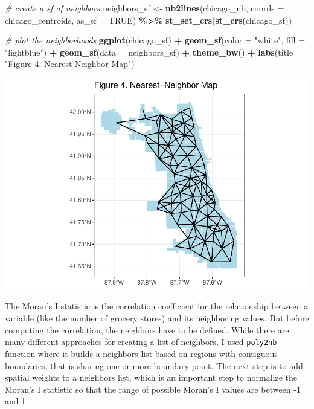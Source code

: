\documentclass[
]{article}
\newenvironment{Shaded}{\begin{snugshade}}{\end{snugshade}}
\newcommand{\AttributeTok}[1]{\textcolor[rgb]{0.13,0.29,0.53}{#1}}
\newcommand{\CommentTok}[1]{\textcolor[rgb]{0.56,0.35,0.01}{\textit{#1}}}
\newcommand{\ConstantTok}[1]{\textcolor[rgb]{0.56,0.35,0.01}{#1}}
\newcommand{\FunctionTok}[1]{\textcolor[rgb]{0.13,0.29,0.53}{\textbf{#1}}}
\newcommand{\NormalTok}[1]{#1}
\newcommand{\OtherTok}[1]{\textcolor[rgb]{0.56,0.35,0.01}{#1}}
\newcommand{\SpecialCharTok}[1]{\textcolor[rgb]{0.81,0.36,0.00}{\textbf{#1}}}
\newcommand{\StringTok}[1]{\textcolor[rgb]{0.31,0.60,0.02}{#1}}
\begin{document}
\begin{Shaded}
\begin{Highlighting}[]
\CommentTok{\# create a sf of neighbors}
\NormalTok{neighbors\_sf }\OtherTok{\textless{}{-}} \FunctionTok{nb2lines}\NormalTok{(chicago\_nb, }
                         \AttributeTok{coords =}\NormalTok{ chicago\_centroids, }
                         \AttributeTok{as\_sf =} \ConstantTok{TRUE}\NormalTok{) }\SpecialCharTok{\%\textgreater{}\%}
  \FunctionTok{st\_set\_crs}\NormalTok{(}\FunctionTok{st\_crs}\NormalTok{(chicago\_sf))}

\CommentTok{\# plot the neighborhoods}
\FunctionTok{ggplot}\NormalTok{(chicago\_sf) }\SpecialCharTok{+} 
  \FunctionTok{geom\_sf}\NormalTok{(}\AttributeTok{color =} \StringTok{"white"}\NormalTok{, }\AttributeTok{fill =} \StringTok{"lightblue"}\NormalTok{) }\SpecialCharTok{+}
  \FunctionTok{geom\_sf}\NormalTok{(}\AttributeTok{data =}\NormalTok{ neighbors\_sf) }\SpecialCharTok{+}
  \FunctionTok{theme\_bw}\NormalTok{() }\SpecialCharTok{+}
  \FunctionTok{labs}\NormalTok{(}\AttributeTok{title =} \StringTok{"Figure 4. Nearest{-}Neighbor Map"}\NormalTok{)}
\end{Highlighting}
\end{Shaded}

\includegraphics[width=0.5\linewidth]{Sam-Song_Coding-Sample_files/figure-latex/unnamed-chunk-5-1}

The Moran's I statistic is the correlation coefficient for the
relationship between a variable (like the number of grocery stores) and
its neighboring values. But before computing the correlation, the
neighbors have to be defined. While there are many different approaches
for creating a list of neighbors, I used \texttt{poly2nb} function where
it builds a neighbors list based on regions with contiguous boundaries,
that is sharing one or more boundary point. The next step is to add
spatial weights to a neighbors list, which is an important step to
normalize the Moran's I statistic so that the range of possible Moran's
I values are between -1 and 1.
\end{document}

